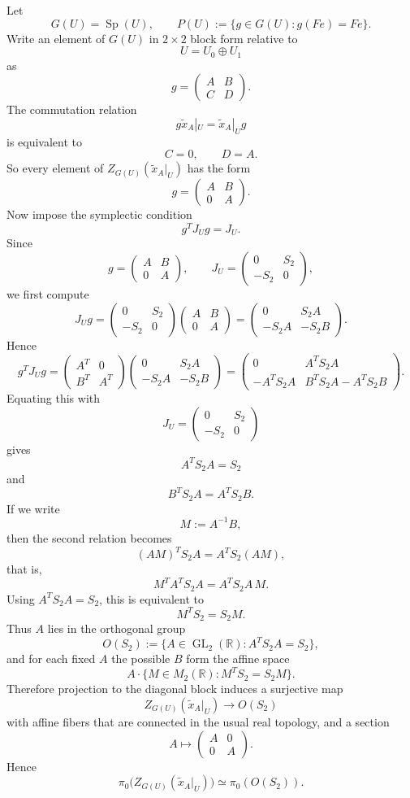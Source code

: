 \documentclass[
  11pt,
]{article}
\begin{document}
Let \[
G(U)=\operatorname{Sp}(U),
\qquad
P(U):=\{g\in G(U):g(Fe)=Fe\}.
\] Write an element of \(G(U)\) in \(2\times 2\) block form relative to
\[
U=U_0\oplus U_1
\] as \[
g=
\begin{pmatrix}
A&B\\
C&D
\end{pmatrix}.
\] The commutation relation \[
g\widetilde x_A|_U=\widetilde x_A|_Ug
\] is equivalent to \[
C=0,
\qquad
D=A.
\] So every element of \(Z_{G(U)}(\widetilde x_A|_U)\) has the form \[
g=
\begin{pmatrix}
A&B\\
0&A
\end{pmatrix}.
\] Now impose the symplectic condition \[
g^T J_U g=J_U.
\] Since \[
g=\begin{pmatrix}A&B\\0&A\end{pmatrix},
\qquad
J_U=\begin{pmatrix}0&S_2\\-S_2&0\end{pmatrix},
\] we first compute \[
J_U g
=
\begin{pmatrix}0&S_2\\-S_2&0\end{pmatrix}
\begin{pmatrix}A&B\\0&A\end{pmatrix}
=
\begin{pmatrix}0&S_2A\\-S_2A&-S_2B\end{pmatrix}.
\] Hence \[
g^T J_U g
=
\begin{pmatrix}A^T&0\\B^T&A^T\end{pmatrix}
\begin{pmatrix}0&S_2A\\-S_2A&-S_2B\end{pmatrix}
=
\begin{pmatrix}
0&A^T S_2A\\
-A^T S_2A&B^T S_2A-A^T S_2B
\end{pmatrix}.
\] Equating this with \[
J_U=\begin{pmatrix}0&S_2\\-S_2&0\end{pmatrix}
\] gives \[
A^T S_2 A=S_2
\] and \[
B^T S_2A=A^T S_2B.
\] If we write \[
M:=A^{-1}B,
\] then the second relation becomes \[
(AM)^T S_2A=A^T S_2(AM),
\] that is, \[
M^T A^T S_2A=A^T S_2A\,M.
\] Using \(A^T S_2A=S_2\), this is equivalent to \[
M^T S_2=S_2M.
\] Thus \(A\) lies in the orthogonal group \[
O(S_2):=\{A\in \operatorname{GL}_2(\mathbb R):A^T S_2 A=S_2\},
\] and for each fixed \(A\) the possible \(B\) form the affine space \[
A\cdot \{M\in M_2(\mathbb R):M^T S_2=S_2M\}.
\] Therefore projection to the diagonal block induces a surjective map
\[
Z_{G(U)}(\widetilde x_A|_U)\to O(S_2)
\] with affine fibers that are connected in the usual real topology, and
a section \[
A\longmapsto
\begin{pmatrix}
A&0\\
0&A
\end{pmatrix}.
\] Hence \[
\pi_0\bigl(Z_{G(U)}(\widetilde x_A|_U)\bigr)\simeq \pi_0(O(S_2)).
\]
\end{document}
